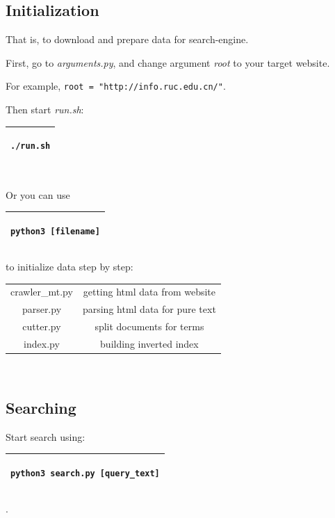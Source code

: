 \documentclass{article}
\begin{document}
\subsection{Initialization}
That is, to download and prepare data for search-engine.

First, go to \emph{arguments.py}, and change argument \emph{root} to your target website.

For example, \texttt{root = "http://info.ruc.edu.cn/"}.

Then start \emph{run.sh}:\\

\begin{tabular}{|l|}\hline\begin{minipage}[t][1em]{4.5em}\begin{verbatim}
./run.sh
\end{verbatim}\end{minipage}\\\hline\end{tabular}\\

Or you can use \begin{tabular}{|l|}\hline\begin{minipage}[t][1em]{9.5em}\begin{verbatim}
python3 [filename]
\end{verbatim}\end{minipage}\\\hline\end{tabular} to initialize data step by step:\\

\begin{tabular}{c|c}
     
crawler\_mt.py     & getting html data from website\\
parser.py         & parsing html data for pure text\\
cutter.py         & split documents for terms\\
index.py          & building inverted index
\end{tabular}
\\

\subsection{Searching}
Start search using: \begin{tabular}{|l|}\hline\begin{minipage}[t][1em]{16em}\begin{verbatim}
python3 search.py [query_text]
\end{verbatim}\end{minipage}\\\hline\end{tabular}.
\end{document}
